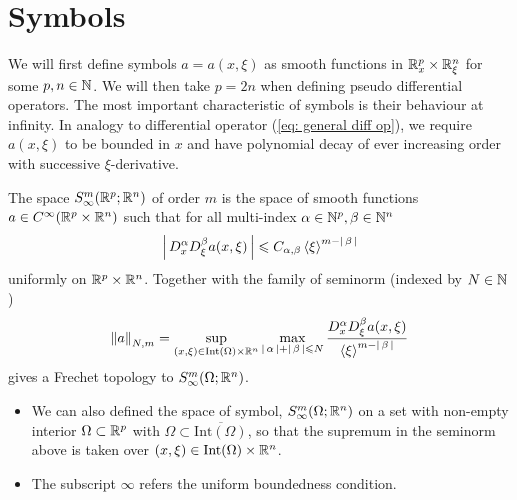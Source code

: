 \documentclass[12pt]{article}
\begin{document}

\section{Symbols}
We will first define symbols $a = a(x, \xi)$ as smooth functions in $\R^p_x \times \R^n_\xi$ for some $p, n \in \N$. We will then take $p = 2n$ when defining pseudo differential operators. The most important characteristic of symbols is their behaviour at infinity. In analogy to differential operator (\ref{eq: general diff op}), we require $a(x, \xi)$ to be bounded in $x$ and have polynomial decay of ever increasing order with successive $\xi$-derivative.  


\begin{fdefinition}
    The space $S^m_\infty(\R^p; \R^n)$ of order $m$ is the space of smooth functions $a \in C^\infty(\R^p \times \R^n)$ such that for all multi-index $\alpha \in \N^p, \beta \in \N^n$
    \begin{align*}
        \abs{D^\alpha_x D^\beta_\xi a (x, \xi)} \leq C_{\alpha, \beta} \sym[\xi]^{m - \abs{\beta}} 
    \end{align*}
    uniformly on $\R^p \times \R^n$. Together with the family of seminorm (indexed by $N \in \N$) 
    \begin{align*}
        \norm[a]_{N, m} = \sup_{(x, \xi) \in \mathrm{Int}(\Omega) \times \R^n} \max_{\abs{\alpha} + \abs{\beta} \leq N} \frac{D^\alpha_x D^\beta_\xi a(x, \xi)}{\sym[\xi]^{m - \abs{\beta}}} 
    \end{align*}
    gives a Frechet topology to $S^m_\infty(\Omega; \R^n)$. \\
\end{fdefinition}
\begin{rem} \hfill 
    \begin{itemize}
        \item  We can also defined the space of symbol, $S^m_\infty(\Omega; \R^n)$ on a set with non-empty interior $\Omega \subset \R^p$ with $\Omega \subset \overline{\mathrm{Int}(\Omega)}$, so that the supremum in the seminorm above is taken over $(x, \xi) \in \mathrm{Int}(\Omega) \times \R^n$. 
        \item The subscript $\infty$ refers the uniform boundedness condition.
    \end{itemize}
\end{rem}
\end{document}
